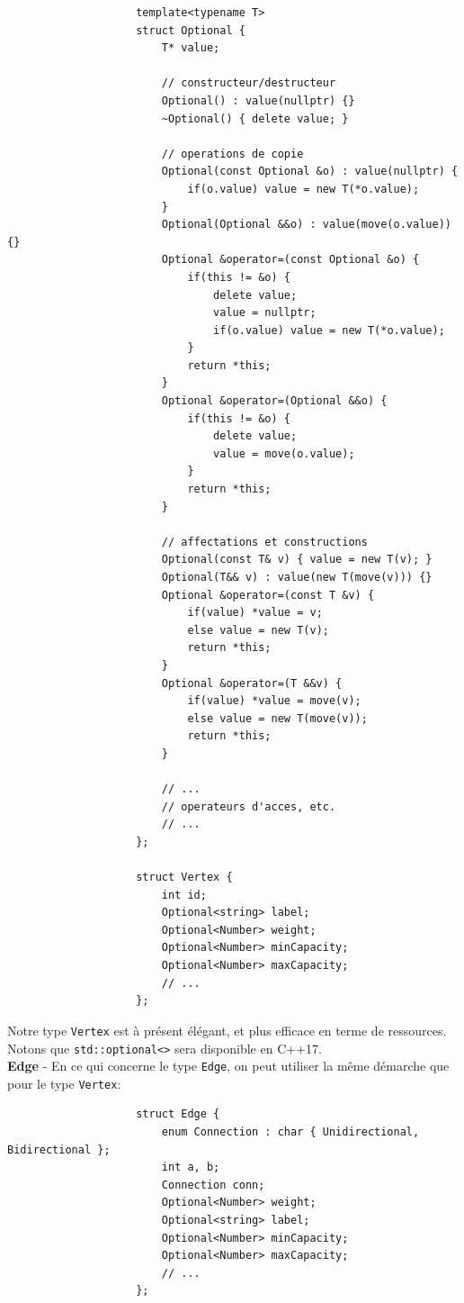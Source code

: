 \documentclass[french]{article}
\begin{document}
				\begin{lstlisting}
					template<typename T>
					struct Optional {
						T* value;
						
						// constructeur/destructeur
						Optional() : value(nullptr) {}
						~Optional() { delete value; }
						
						// operations de copie
						Optional(const Optional &o) : value(nullptr) { 
							if(o.value) value = new T(*o.value); 
						}
						Optional(Optional &&o) : value(move(o.value)) {}
						Optional &operator=(const Optional &o) {
							if(this != &o) {
								delete value;
								value = nullptr;
								if(o.value) value = new T(*o.value);
							}
							return *this;
						}
						Optional &operator=(Optional &&o) {
							if(this != &o) {
								delete value;
								value = move(o.value);
							}
							return *this;
						}
						
						// affectations et constructions
						Optional(const T& v) { value = new T(v); }
						Optional(T&& v) : value(new T(move(v))) {}
						Optional &operator=(const T &v) {
							if(value) *value = v;
							else value = new T(v);
							return *this;
						}
						Optional &operator=(T &&v) {
							if(value) *value = move(v);
							else value = new T(move(v));
							return *this;
						}
						
						// ...
						// operateurs d'acces, etc.
						// ...
					};
					
					struct Vertex {
						int id;
						Optional<string> label;
						Optional<Number> weight;
						Optional<Number> minCapacity;
						Optional<Number> maxCapacity;
						// ...
					};
				\end{lstlisting} 
				
				Notre type \texttt{Vertex} est à présent élégant, et plus efficace en terme de ressources. Notons que \texttt{std::optional<>} sera disponible en C++17.\\
				
				\textbf{Edge} - En ce qui concerne le type \texttt{Edge}, on peut utiliser la même démarche que pour le type \texttt{Vertex}:
				
				\begin{lstlisting}
					struct Edge {
						enum Connection : char { Unidirectional, Bidirectional };
						int a, b;
						Connection conn;
						Optional<Number> weight;
						Optional<string> label;
						Optional<Number> minCapacity;
						Optional<Number> maxCapacity;
						// ...
					};
				\end{lstlisting}
				
\end{document}
